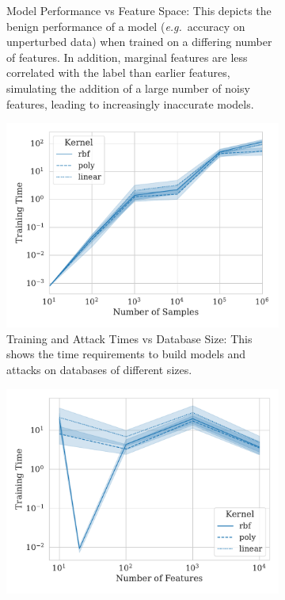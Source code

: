 \documentclass[fonts]{icst}
\begin{document}
\begin{figure}
\begin{subfigure}{.45\textwidth}
        \caption{Model Performance vs Feature Space: This depicts the benign performance of a model (\textit{e.g.}~accuracy on unperturbed data) when trained on a differing number of features. In addition, marginal features are less correlated with the label than earlier features, simulating the addition of a large number of noisy features, leading to increasingly inaccurate models.}
        \label{fig:features_acc}
    \end{subfigure}
    \hfill
    \begin{subfigure}{.45\textwidth}
        \centering
        \includegraphics[width=\textwidth]{./generated/train_time_vs_samples.pdf}
        \caption{Training and Attack Times vs Database Size: This shows the time requirements to build models and attacks on databases of different sizes.
        }
        \label{fig:samples_time}
    \end{subfigure}
    \hfill
    \begin{subfigure}{.45\textwidth}
      \centering
        \includegraphics[width=\textwidth]{./generated/train_time_vs_features.pdf}

\end{subfigure}
\end{figure}
\end{document}
